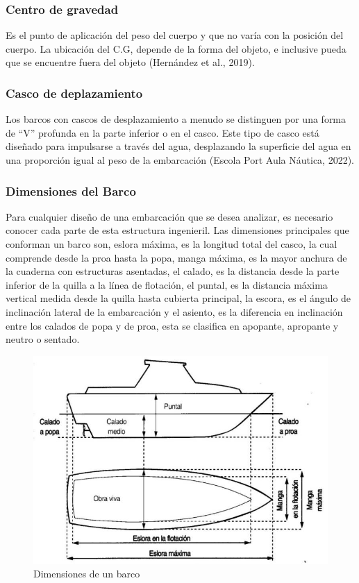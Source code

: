 \documentclass[letterpaper]{article}
\begin{document}
\subsubsection{Centro de gravedad}
\setlength{\parindent}{18pt}
Es el punto de aplicación del peso del cuerpo y que no varía con la posición del cuerpo. La ubicación del C.G, 
depende de la forma del objeto, e inclusive pueda que se encuentre fuera del objeto (Hernández et al., 2019).

\subsubsection{Casco de deplazamiento}
\setlength{\parindent}{18pt}
Los barcos con cascos de desplazamiento a menudo se distinguen por una forma de ``V'' profunda en la parte 
inferior o en el casco. Este tipo de casco está diseñado para impulsarse a través del agua, desplazando 
la superficie del agua en una proporción igual al peso de la embarcación (Escola Port Aula Náutica, 2022).
\subsubsection{Dimensiones del Barco}
\setlength{\parindent}{18pt}
Para cualquier diseño de una embarcación que se desea analizar, es necesario conocer cada parte de esta 
estructura ingenieril. Las dimensiones principales que conforman un barco son, eslora máxima, es la longitud 
total del casco, la cual comprende desde la proa hasta la popa, manga máxima, es la mayor anchura de la 
cuaderna con estructuras asentadas, el calado, es la distancia desde la parte inferior de la quilla a la 
línea de flotación, el puntal, es la distancia máxima vertical medida desde la quilla hasta cubierta 
principal, la escora, es el ángulo de inclinación lateral de la embarcación y el asiento, es la diferencia
 en inclinación entre los calados de popa y de proa, esta se clasifica en apopante, apropante y neutro o sentado.
 \begin{figure}[h]
	\centering
	\includegraphics[width=0.5 \textwidth]{dimensionestemporal.jpg}
	\caption{ Dimensiones de un barco}
	\label{fig:imagen00}
\end{figure}
\end{document}
